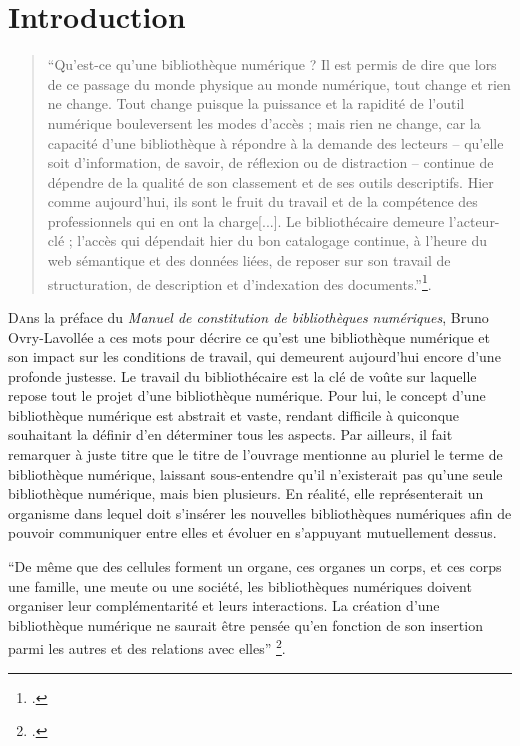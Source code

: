 \chapter{Introduction}

\begin{quote}
\enquote{Qu'est-ce qu'une bibliothèque numérique ? Il est permis de dire que lors de ce passage du monde physique au monde numérique, tout change et rien ne change. Tout change puisque la puissance et la rapidité de l'outil numérique bouleversent les modes d'accès ; mais rien ne change, car la capacité d'une bibliothèque à répondre à la demande des lecteurs -- qu'elle soit d'information, de savoir, de réflexion ou de distraction -- continue de dépendre de la qualité de son classement et de ses outils descriptifs. Hier comme aujourd'hui, ils sont le fruit du travail et de la compétence des professionnels qui en ont la charge[...]. Le bibliothécaire demeure l'acteur-clé ; l'accès qui dépendait hier du bon catalogage continue, à l'heure du web sémantique et des données liées, de reposer sur son travail de structuration, de description et d'indexation des documents.}\footcite{claerrManuelConstitutionBibliotheques2013a}.
\end{quote}
\medskip

\lettrine{D}ans la préface du \textit{Manuel de constitution de bibliothèques numériques}, Bruno Ovry-Lavollée a ces mots pour décrire ce qu'est une bibliothèque numérique et son impact sur les conditions de travail, qui demeurent aujourd'hui encore d'une profonde justesse. Le travail du bibliothécaire est la clé de voûte sur laquelle repose tout le projet d'une bibliothèque numérique. Pour lui, le concept d'une bibliothèque numérique est abstrait et vaste, rendant difficile à quiconque souhaitant la définir d'en déterminer tous les aspects. Par ailleurs, il fait remarquer à juste titre que le titre de l'ouvrage mentionne au pluriel le terme de bibliothèque numérique, laissant sous-entendre qu'il n'existerait pas qu'une seule bibliothèque numérique, mais bien plusieurs. En réalité, elle représenterait un organisme dans lequel doit s'insérer les nouvelles bibliothèques numériques afin de pouvoir communiquer entre elles et évoluer en s'appuyant mutuellement dessus.

\enquote{De même que des cellules forment un organe, ces organes un corps, et ces corps une famille, une meute ou une société, les bibliothèques numériques doivent organiser leur complémentarité et leurs interactions. La création d'une bibliothèque numérique ne saurait être pensée qu'en fonction de son insertion parmi les autres et des relations avec elles} \footcite{claerrManuelConstitutionBibliotheques2013a}.
\medskip


